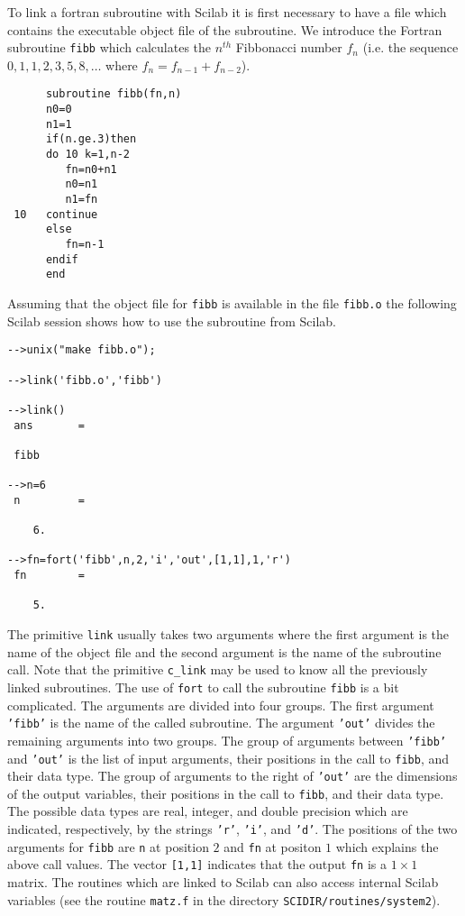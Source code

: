 	To link a fortran subroutine with Scilab it is first necessary
to have a file which contains the executable object file of the subroutine.
We introduce the Fortran subroutine {\tt fibb} which calculates the
$n^{th}$ Fibbonacci number $f_n$ (i.e. the sequence $0,1,1,2,3,5,8,\ldots$
where $f_n=f_{n-1}+f_{n-2}$).
\begin{verbatim}
      subroutine fibb(fn,n)
      n0=0
      n1=1
      if(n.ge.3)then
      do 10 k=1,n-2
         fn=n0+n1
         n0=n1
         n1=fn
 10   continue
      else
         fn=n-1
      endif
      end
\end{verbatim}
Assuming that the object file for {\tt fibb} is available in the
file {\tt fibb.o} the following Scilab session shows how to use
the subroutine from Scilab.
\begin{verbatim}
-->unix("make fibb.o");
 
-->link('fibb.o','fibb')
 
-->link()
 ans       =
 
 fibb                   
 
-->n=6
 n         =
 
    6.  
 
-->fn=fort('fibb',n,2,'i','out',[1,1],1,'r')
 fn        =
 
    5.  
\end{verbatim}
The primitive {\tt link} usually takes two arguments where the
first argument is the name of the object file and the second argument
is the name of the subroutine call.  Note that the primitive \verb!c_link!
may be used to know  all the previously linked subroutines.  
The use of {\tt fort} to call the subroutine {\tt fibb}
is a bit complicated.  The arguments are divided into four groups.
The first argument {\tt 'fibb'} is the name of the called subroutine.
The argument {\tt 'out'} divides the remaining arguments into two 
groups.  The group of arguments between {\tt 'fibb'} and {\tt 'out'}
is the list of input arguments, their positions in the call to {\tt fibb},
and their data type.  The group of arguments to the right of {\tt 'out'}
are the dimensions of the output variables, their positions in the call
to {\tt fibb}, and their data type.
The possible data types are real, integer, and double precision which
are indicated, respectively, by the strings {\tt 'r'}, {\tt 'i'}, and
{\tt 'd'}.  The positions of the two arguments for {\tt fibb} are
{\tt n} at position $2$ and {\tt fn} at positon $1$ which explains
the above call values.  The vector {\tt [1,1]} indicates that the output
{\tt fn} is a $1\times 1$ matrix.
The routines which are linked to Scilab can also access internal 
Scilab variables (see the routine {\tt matz.f}
in the directory {\tt SCIDIR/routines/system2}).

